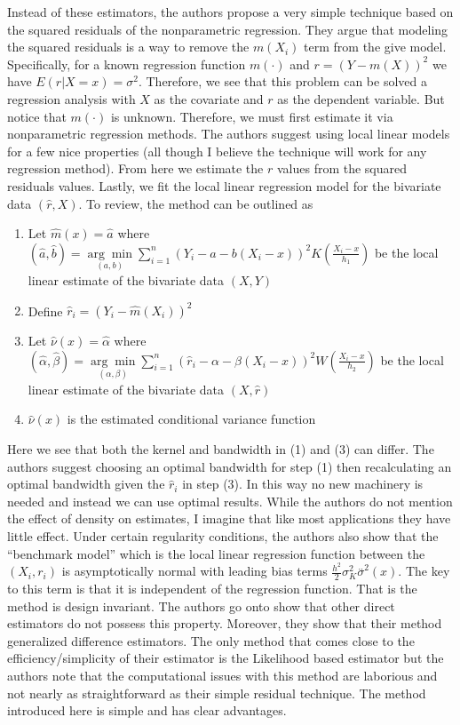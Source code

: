 \documentclass[12pt]{article}  %
\begin{document}
Instead of these estimators, the authors propose a very simple technique based on the squared residuals of the nonparametric regression. They argue that modeling the squared residuals is a way to remove the $m(X_i)$ term from the give model. Specifically, for a known regression function $m(\cdot)$ and $r = (Y -m(X))^2$ we have $E(r|X = x) = \sigma^2$. Therefore, we see that this problem can be solved a regression analysis with $X$ as the covariate and $r$ as the dependent variable. But notice that $m(\cdot)$ is unknown. Therefore, we must first estimate it via nonparametric regression methods. The authors suggest using local linear models for a few nice properties (all though I believe the technique will work for any regression method). From here we estimate the $r$ values from the squared residuals values. Lastly, we fit the local linear regression model for the bivariate data $(\hat{r}, X)$. To review, the method can be outlined as 
\begin{enumerate}
\item Let $\hat{m}(x) = \hat{a}$  where $(\hat{a}, \hat{b}) = \underset{(a, b)}{\arg\min}\sum_{i=1}^{n}\left(Y_i - a - b(X_i - x)\right)^2K\left(\frac{X_i - x}{h_1}\right)$ be the local linear estimate of the bivariate data $(X,Y)$
\item Define $\hat{r}_i = (Y_i - \hat{m}(X_i))^2$
\item Let $\hat{\nu}(x) = \hat{\alpha}$  where $(\hat{\alpha}, \hat{\beta}) = \underset{(\alpha, \beta)}{\arg\min}\sum_{i=1}^{n}\left(\hat{r}_i- \alpha - \beta(X_i - x)\right)^2W\left(\frac{X_i - x}{h_2}\right)$ be the local linear estimate of the bivariate data $(X,\hat{r})$
\item $\hat{\nu}(x)$ is the estimated conditional variance function 
\end{enumerate}

Here we see that both the kernel and bandwidth in (1) and (3) can differ. The authors suggest choosing an optimal bandwidth for step (1) then recalculating an optimal bandwidth given the $\hat{r}_i$ in step (3). In this way no new machinery is needed and instead we can use optimal results. While the authors do not mention the effect of density on estimates, I imagine that like most applications they have little effect. 
Under certain regularity conditions, the authors also show that the ``benchmark model'' which is the local linear regression function between the $(X_i, r_i)$ is asymptotically normal with leading bias terms $\frac{h^2}{2}\sigma^{2}_{K}\overset{..}{\sigma}^2(x)$. The key to this term is that it is independent of the regression function. That is the method is design invariant. The authors go onto show that other direct estimators do not possess this property. Moreover, they show that their method generalized difference estimators. The only method that comes close to the efficiency/simplicity of their estimator is the Likelihood based estimator but the authors note that the computational issues with this method are laborious and not nearly as straightforward as their simple residual technique. The method introduced here is simple and has clear advantages.  
\end{document}
